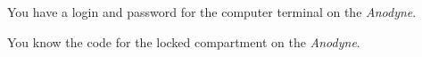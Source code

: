 \documentclass[char]{guildcamp4}
\begin{document}
\begin{itemz}[Notes]
	\item You have a login and password for the computer terminal on the \emph{Anodyne}.
	\item You know the code for the locked compartment on the \emph{Anodyne}.
\end{itemz}

\begin{contacts}
	\contact{\cCgood{}}
	\contact{\cPilot{}}
	\contact{\cVone{}}
\end{contacts}
\end{document}
